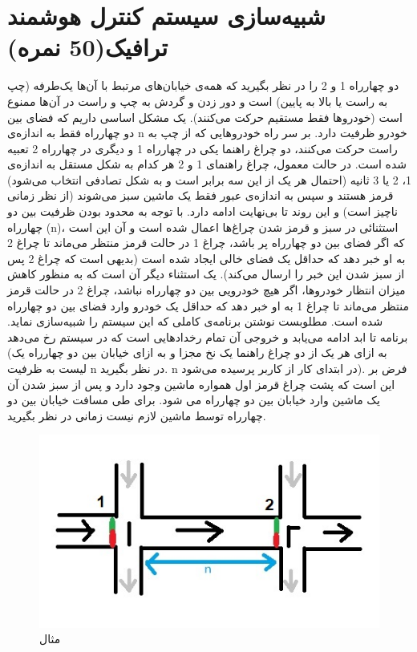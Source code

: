 \documentclass[]{article}
\begin{document}
\section{شبیه‌سازی سیستم کنترل هوشمند ترافیک(50 نمره)}
دو چهارراه 1 و 2 را در نظر بگیرید که همه‌ی خیابان‌های مرتبط با آن‌ها یک‌طرفه (چپ 
به راست یا بالا به پایین) است و دور زدن و گردش به چپ و راست در آن‌ها ممنوع 
است 
(خودروها فقط مستقیم حرکت می‌کنند). یک مشکل اساسی داریم که فضای بین دو 
چهارراه 
فقط به اندازه‌ی n خودرو ظرفیت دارد. بر سر راه خودروهایی که از چپ به راست حرکت 
می‌کنند، دو چراغ راهنما یکی در چهارراه 1 و دیگری در چهارراه 2 تعبیه شده است. 
در حالت معمول، چراغ راهنمای 1 و 2 هر کدام به شکل مستقل به اندازه‌ی 1، 2 یا 3 
ثانیه (احتمال هر یک از این سه برابر است و به شکل تصادفی انتخاب می‌شود) قرمز 
هستند و سپس به اندازه‌ی عبور فقط یک ماشین سبز می‌شوند (از نظر زمانی ناچیز است) 
و این روند تا بی‌نهایت ادامه دارد. با توجه به محدود بودن ظرفیت بین دو چهارراه  
(n)، استثنائی در سبز و قرمز شدن چراغ‌ها اعمال شده است و آن این است که اگر 
فضای بین دو چهارراه پر باشد، چراغ 1 در حالت قرمز منتظر می‌ماند تا چراغ 2 به 
او خبر دهد که حداقل یک فضای خالی ایجاد شده است (بدیهی است که چراغ 2 پس از 
سبز شدن این خبر را ارسال می‌کند). یک استثناء دیگر آن است که به منظور کاهش 
میزان انتظار خودروها، اگر هیچ خودرویی بین دو چهارراه نباشد، چراغ 2 در حالت 
قرمز منتظر می‌ماند تا چراغ 1 به او خبر دهد که حداقل یک خودرو وارد فضای بین دو 
چهارراه شده است. مطلوبست نوشتن برنامه‌ی کاملی که این سیستم را شبیه‌سازی نماید. 
برنامه تا ابد ادامه می‌یابد و خروجی آن تمام رخدادهایی است که در سیستم رخ 
می‌دهد (به ازای هر یک از دو چراغ راهنما یک نخ مجزا و به ازای خیابان بین دو 
چهارراه یک لیست به ظرفیت n در نظر بگیرید. n در ابتدای کار از کاربر پرسیده 
می‌شود). فرض بر این است که پشت چراغ قرمز اول همواره ماشین وجود دارد و پس از 
سبز شدن آن یک ماشین وارد خیابان بین دو چهارراه می شود. برای طی مسافت خیابان 
بین دو چهارراه توسط ماشین لازم نیست زمانی در نظر بگیرید.

\begin{figure}[H]
	\includegraphics[width=\linewidth]{example.png}
	\caption{مثال}
	\label{}
\end{figure}
\end{document}

